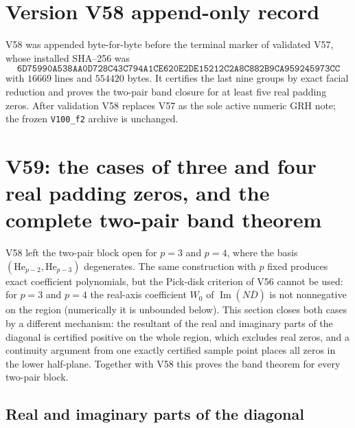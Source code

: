\documentclass[11pt]{article}
\theoremstyle{definition}
\theoremstyle{remark}
\begin{document}
\section*{Version V58 append-only record}

V58 was appended byte-for-byte before the terminal marker of validated
V57, whose installed SHA--256 was
\[
 \texttt{6D75990A538AA0D728C43C794A1CE620}
 \allowbreak\texttt{E2DE15212C2A8C882B9CA959245973CC}
\]
with \(16669\) lines and \(554420\) bytes.  It certifies the last nine
groups by exact facial reduction and proves the two-pair band closure
for at least five real padding zeros.  After validation V58 replaces
V57 as the sole active numeric GRH note; the frozen \texttt{V100\_f2}
archive is unchanged.





\clearpage
\section{V59: the cases of three and four real padding zeros, and the complete two-pair band theorem}
\label{sec:f2v59-p34}
\begingroup
\setcounter{equation}{0}
\renewcommand{\theequation}{N59.\arabic{equation}}
\renewcommand{\theHequation}{f2v59.\arabic{equation}}

V58 left the two-pair block open for \(p=3\) and \(p=4\), where the
basis \((\mathrm{He}_{p-2},\mathrm{He}_{p-3})\) degenerates.  The same
construction with \(p\) fixed produces exact coefficient polynomials, but
the Pick-disk criterion of V56 cannot be used: for \(p=3\) and \(p=4\) the
real-axis coefficient \(W_0\) of \(\operatorname{Im}(N\overline D)\) is
not nonnegative on the region (numerically it is unbounded below).  This
section closes both cases by a different mechanism: the resultant of the
real and imaginary parts of the diagonal is certified positive on the
whole region, which excludes real zeros, and a continuity argument from
one exactly certified sample point places all zeros in the lower
half-plane.  Together with V58 this proves the band theorem for every
two-pair block.

\subsection{Real and imaginary parts of the diagonal}
\end{document}
